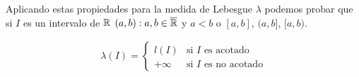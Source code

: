 Aplicando estas propiedades para la medida de Lebesgue $\lambda$ podemos probar que si $I$ es un intervalo de $\mathbb{R}$ $(a, b) : a, b \in \overline{\mathbb{R}}$ y $a<b$ o $[a, b]$, $(a, b]$, $[a, b)$.

\begin{align*}
    \lambda(I) = \begin{cases}
                     l(I)    & \text{si } I \text{ es acotado}    \\
                     +\infty & \text{si } I \text{ es no acotado}
                 \end{cases}
\end{align*}
